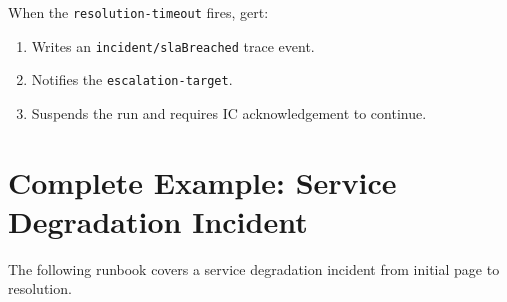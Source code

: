 When the \texttt{resolution-timeout} fires, gert:
\begin{enumerate}
  \item Writes an \texttt{incident/slaBreached} trace event.
  \item Notifies the \texttt{escalation-target}.
  \item Suspends the run and requires IC acknowledgement to continue.
\end{enumerate}

\section{Complete Example: Service Degradation Incident}
\label{sec:ir-complete-example}

The following runbook covers a service degradation incident from initial page to resolution.

